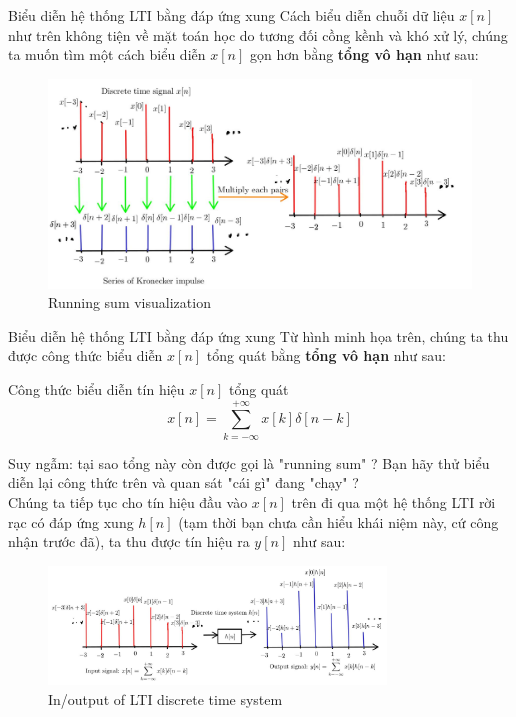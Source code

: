 \documentclass[8pt]{beamer}
\begin{document}
\begin{frame}{Biểu diễn hệ thống LTI bằng đáp ứng xung}
	Cách biểu diễn chuỗi dữ liệu $x[n]$ như trên không tiện về mặt toán học do tương đối cồng kềnh và khó xử lý, chúng ta muốn tìm một cách biểu diễn $x[n]$ gọn hơn bằng \textbf{tổng vô hạn} như sau:

 \begin{figure}[h]
			\includegraphics[width=1\textwidth]{process.jpg}
			\caption{Running sum visualization}\label{fig:re2}
		\end{figure}
\end{frame}
\begin{frame}{Biểu diễn hệ thống LTI bằng đáp ứng xung}
Từ hình minh họa trên, chúng ta thu được công thức biểu diễn $x[n]$ tổng quát bằng \textbf{tổng vô hạn} như sau:
\begin{block}{Công thức biểu diễn tín hiệu $x[n]$ tổng quát}
	$$x[n]=\sum_{k=-\infty}^{+\infty}x[k]\delta[n-k]$$
\end{block}
Suy ngẫm: tại sao tổng này còn được gọi là "running sum" ? Bạn hãy thử biểu diễn lại công thức trên và quan sát "cái gì" đang "chạy" ?
\\ Chúng ta tiếp tục cho tín hiệu đầu vào $x[n]$ trên đi qua một hệ thống LTI rời rạc có \alert{đáp ứng xung $h[n]$} (tạm thời bạn chưa cần hiểu khái niệm này, cứ công nhận trước đã), ta thu được tín hiệu ra $y[n]$ như sau:
\begin{figure}[h]
			\includegraphics[width=0.8\textwidth]{system.jpg}
			\caption{In/output of LTI discrete time system}\label{fig:re3}
		\end{figure}
\end{frame}
\end{document}
